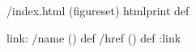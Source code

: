 /index.html {(figureset) htmlprint} def
\begin{ingrid}
link:
/name () def
/href () def
:link


\end{ingrid}